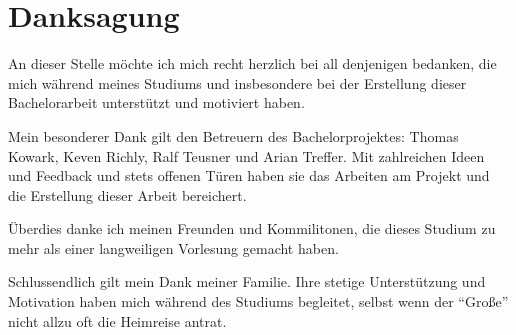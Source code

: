 \section*{Danksagung}
An dieser Stelle möchte ich mich recht herzlich bei all denjenigen bedanken, die mich während meines Studiums und insbesondere bei der Erstellung dieser Bachelorarbeit unterstützt und motiviert haben. 

Mein besonderer Dank gilt den Betreuern des Bachelorprojektes: Thomas Kowark, Keven Richly, Ralf Teusner und Arian Treffer.
Mit zahlreichen Ideen und Feedback und stets offenen Türen haben sie das Arbeiten am Projekt und die Erstellung dieser Arbeit bereichert.

Überdies danke ich meinen Freunden und Kommilitonen, die dieses Studium zu mehr als einer langweiligen Vorlesung gemacht haben.

Schlussendlich gilt mein Dank meiner Familie. Ihre stetige Unterstützung und Motivation haben mich während des Studiums begleitet, selbst wenn der ``Große'' nicht allzu oft die Heimreise antrat.
